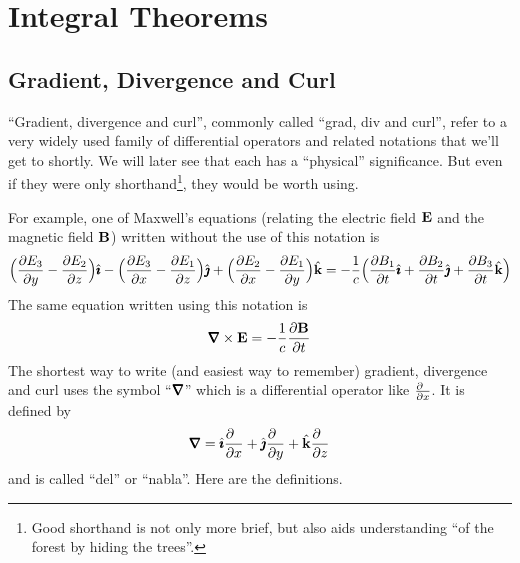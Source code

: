 \graphicspath{{figures/integral_theorems/}}
\chapter{Integral Theorems}\label{chap integral theorems}

\section{Gradient, Divergence and Curl}\label{sec:graadDivCurl}

``Gradient, divergence and curl'', commonly called ``grad, div and curl'',
 refer to a very widely used family of differential operators and related notations that we'll get to shortly. We will 
later see that each has a ``physical'' significance. But even if they
were only shorthand\footnote{Good shorthand is not only more brief,
but also aids understanding ``of the forest by hiding the trees''.}, 
they would be worth using.

For example,
one of Maxwell's equations (relating the electric field $\mathbf{E}$ and
the magnetic field $\mathbf{B}$) written without the use of this notation is
\begin{align*}
\Big(\frac{\partial E_3}{\partial y} -\frac{\partial E_2}{\partial z}\Big)\hat{\pmb{\imath}}
-\Big(\frac{\partial E_3}{\partial x} -\frac{\partial E_1}{\partial z}\Big)\hat{\pmb{\jmath}}
+\Big(\frac{\partial E_2}{\partial x} -\frac{\partial E_1}{\partial y}\Big)\hat{\mathbf{k}}
=-\frac{1}{c}\Big(\frac{\partial B_1}{\partial t} \hat{\pmb{\imath}}
+\frac{\partial B_2}{\partial t} \hat{\pmb{\jmath}}
+\frac{\partial B_3}{\partial t} \hat{\mathbf{k}}\Big)
\end{align*}
The same equation written using this notation is
\begin{equation*}
\vnabla\times\vE = -\frac{1}{c}\frac{\partial \vB}{\partial t}
\end{equation*}
The shortest way to write (and  easiest way to remember) gradient,
divergence and curl uses the symbol ``$\vnabla$'' which is a differential
operator like $\frac{\partial\hfill}{\partial x}$. It is defined by
\begin{equation*}
\vnabla = \hi\frac{\partial\hfill}{\partial x}
          +\hj\frac{\partial\hfill}{\partial y}
          +\hk\frac{\partial\hfill}{\partial z}
\end{equation*}
and is called ``del'' or ``nabla''.  Here are the definitions.


